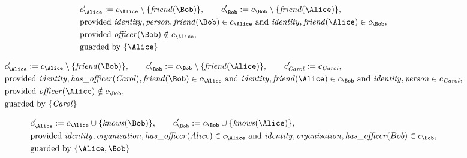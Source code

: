 \begin{align*}
&
c'_
{
\Alice
}
 := 
c_
{
\Alice
}
 \setminus 
\{
\mathit{\detokenize{
friend
}}
(
\Bob
)
\}
, \qquad 
c'_
{
\Bob
}
 := 
c_
{
\Bob
}
 \setminus 
\{
\mathit{\detokenize{
friend
}}
(
\Alice
)
\}
,\\
&
\text{provided } 
\mathit{\detokenize{
identity
}}
,
\mathit{\detokenize{
person
}}
,
\mathit{\detokenize{
friend
}}
(
\Bob
)
 \in c_
{
\Alice
}
 \text{ and } 
\mathit{\detokenize{
identity
}}
,
\mathit{\detokenize{
friend
}}
(
\Alice
)
 \in c_
{
\Bob
}
,\\
&
\text{provided } 
\mathit{\detokenize{
officer
}}
(
\Bob
)
 \notin c_
{
\Alice
}
,\\
&
\text{guarded by } \{
\Alice
\}
\end{align*}

\begin{align*}
&
c'_
{
\Alice
}
 := 
c_
{
\Alice
}
 \setminus 
\{
\mathit{\detokenize{
friend
}}
(
\Bob
)
\}
, \qquad 
c'_
{
\Bob
}
 := 
c_
{
\Bob
}
 \setminus 
\{
\mathit{\detokenize{
friend
}}
(
\Alice
)
\}
, \qquad 
c'_
{
\mathit{Carol}
}
 := 
c_
{
\mathit{Carol}
}
,\\
&
\text{provided } 
\mathit{\detokenize{
identity
}}
,
\mathit{\detokenize{
has_officer
}}
(
\mathit{Carol}
)
,
\mathit{\detokenize{
friend
}}
(
\Bob
)
 \in c_
{
\Alice
}
 \text{ and } 
\mathit{\detokenize{
identity
}}
,
\mathit{\detokenize{
friend
}}
(
\Alice
)
 \in c_
{
\Bob
}
 \text{ and } 
\mathit{\detokenize{
identity
}}
,
\mathit{\detokenize{
person
}}
 \in c_
{
\mathit{Carol}
}
,\\
&
\text{provided } 
\mathit{\detokenize{
officer
}}
(
\Alice
)
 \notin c_
{
\Bob
}
,\\
&
\text{guarded by } \{
\mathit{Carol}
\}
\end{align*}

\begin{align*}
&
c'_
{
\Alice
}
 := 
c_
{
\Alice
}
 \cup 
\{
\mathit{\detokenize{
knows
}}
(
\Bob
)
\}
, \qquad 
c'_
{
\Bob
}
 := 
c_
{
\Bob
}
 \cup 
\{
\mathit{\detokenize{
knows
}}
(
\Alice
)
\}
,\\
&
\text{provided } 
\mathit{\detokenize{
identity
}}
,
\mathit{\detokenize{
organisation
}}
,
\mathit{\detokenize{
has_officer
}}
(
Alice
)
 \in c_
{
\Alice
}
 \text{ and } 
\mathit{\detokenize{
identity
}}
,
\mathit{\detokenize{
organisation
}}
,
\mathit{\detokenize{
has_officer
}}
(
Bob
)
 \in c_
{
\Bob
}
,\\
&
\text{guarded by } \{
\Alice
,
\Bob
\}
\end{align*}

